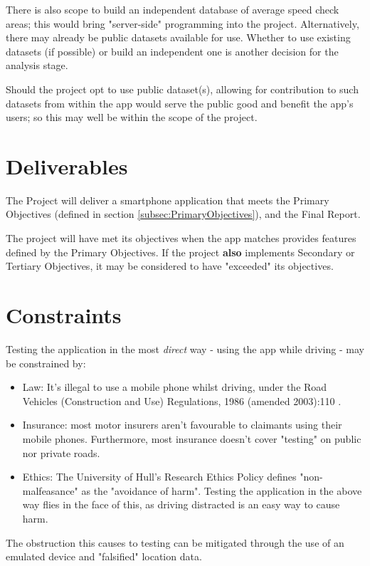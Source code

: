 \documentclass[11pt, a4paper, notitlepage]{report}
\begin{document}
There is also scope to build an independent database of average speed check 
areas; this would bring "server-side" programming into the project. 
Alternatively, there may already be public datasets available for use. Whether 
to use existing datasets (if possible) or build an independent one is another 
decision for the analysis stage. 

Should the project opt to use public dataset(s), allowing for contribution to 
such datasets from within the app would serve the public good and benefit the 
app's users; so this may well be within the scope of the project.

\section{Deliverables}
The Project will deliver a smartphone application that meets the Primary 
Objectives (defined in section \ref{subsec:PrimaryObjectives}), and the Final Report.

The project will have met its objectives when the app matches provides features 
defined by the Primary Objectives. If the project \textbf{also} implements 
Secondary or Tertiary Objectives, it may be considered to have "exceeded" its 
objectives.

\section{Constraints}\label{sec:Constraints}
Testing the application in the most \textit{direct} way - using the app while 
driving - may be constrained by:
\begin{itemize}
    \item Law: It's illegal to use a mobile phone whilst driving, under the 
    Road Vehicles (Construction and Use) Regulations, 1986 (amended 2003):110 
    \citep{RoadVehiclesSI}.
    \item Insurance: most motor insurers aren't favourable to claimants using 
	their mobile phones. Furthermore, most insurance doesn't cover "testing" on 
	public nor private roads.
    \item Ethics: The University of Hull's Research Ethics Policy 
    \citep{HullEthicsPolicy} defines "non-malfeasance" as the "avoidance of 
    harm". Testing the application in the above way flies in the face of this, 
    as driving distracted is an easy way to cause harm.
\end{itemize}
The obstruction this causes to testing can be mitigated through the use of an 
emulated device and "falsified" location data.
\end{document}
